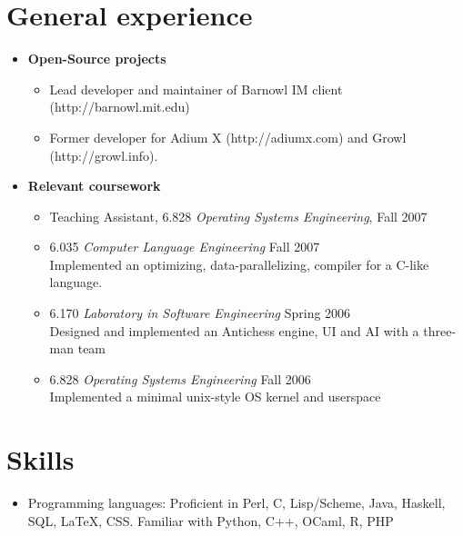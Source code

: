 \documentclass[letterpaper,10pt]{article}
\begin{document}
\vspace*{-0.7cm}
\section*{General experience}
\vspace*{-0.2cm}
\begin{itemize}
  \item \textbf{Open-Source projects} \\
    \vspace*{-0.5cm}
    \begin{itemize}
      \item Lead developer and maintainer of Barnowl IM client
        (http://barnowl.mit.edu)
      \item Former developer for Adium X (http://adiumx.com) and Growl
        (http://growl.info).
    \end{itemize}

  \item \textbf{Relevant coursework}
  \begin{itemize}
      \item Teaching Assistant, 6.828 {\em Operating Systems Engineering}, Fall 2007
      \item 6.035 {\em Computer Language Engineering} Fall 2007 \\
        Implemented an optimizing, data-parallelizing, compiler for a
        C-like language.
      \item 6.170 {\em Laboratory in Software Engineering} Spring 2006 \\
        Designed and implemented an Antichess engine, UI and AI with a three-man team
      \item 6.828 {\em Operating Systems Engineering} Fall 2006 \\
        Implemented a minimal unix-style OS kernel and userspace
  \end{itemize}
\end{itemize}

\section*{Skills}
\vspace*{-0.2cm}
\begin{itemize}
\item Programming languages: Proficient in Perl, C, Lisp/Scheme, Java,
  Haskell, SQL, \LaTeX, CSS. Familiar with Python, C++, OCaml, R, PHP

\end{itemize}
\end{document}
